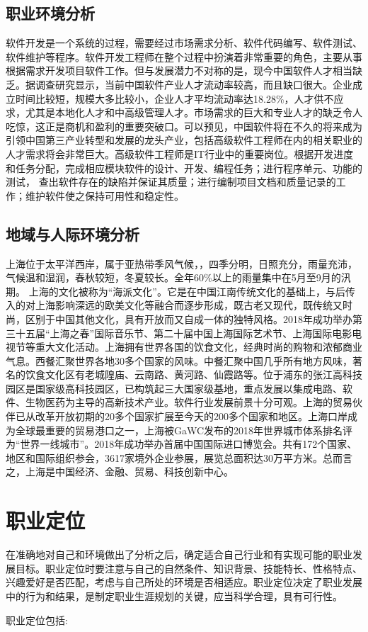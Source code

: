 \documentclass{article}
\begin{document}
\subsection{职业环境分析}
软件开发是一个系统的过程，需要经过市场需求分析、软件代码编写、软件测试、软件维护等程序。软件开发工程师在整个过程中扮演着非常重要的角色，主要从事根据需求开发项目软件工作。但与发展潜力不对称的是，现今中国软件人才相当缺乏。据调查研究显示，当前中国软件产业人才流动率较高，而且缺口很大。企业成立时间比较短，规模大多比较小，企业人才平均流动率达18.28\%，人才供不应求，尤其是本地化人才和中高级管理人才。市场需求的巨大和专业人才的缺乏令人吃惊，这正是商机和盈利的重要突破口。可以预见，中国软件将在不久的将来成为引领中国第三产业转型和发展的龙头产业，包括高级软件工程师在内的相关职业的人才需求将会非常巨大。高级软件工程师是IT行业中的重要岗位。根据开发进度和任务分配，完成相应模块软件的设计、开发、编程任务；进行程序单元、功能的测试， 查出软件存在的缺陷并保证其质量；进行编制项目文档和质量记录的工作；维护软件使之保持可用性和稳定性。\par


\subsection{地域与人际环境分析}
上海位于太平洋西岸，属于亚热带季风气候，，四季分明，日照充分，雨量充沛，气候温和湿润，春秋较短，冬夏较长。全年60\%以上的雨量集中在5月至9月的汛期。 上海的文化被称为“海派文化”。它是在中国江南传统文化的基础上，与后传入的对上海影响深远的欧美文化等融合而逐步形成，既古老又现代，既传统又时尚，区别于中国其他文化，具有开放而又自成一体的独特风格。2018年成功举办第三十五届“上海之春”国际音乐节、第二十届中国上海国际艺术节、上海国际电影电视节等重大文化活动。上海拥有世界各国的饮食文化，经典时尚的购物和浓郁商业气息。西餐汇聚世界各地30多个国家的风味。中餐汇聚中国几乎所有地方风味，著名的饮食文化区有老城隍庙、云南路、黄河路、仙霞路等。位于浦东的张江高科技园区是国家级高科技园区，已构筑起三大国家级基地，重点发展以集成电路、软件、生物医药为主导的高新技术产业。软件行业发展前景十分可观。上海的贸易伙伴已从改革开放初期的20多个国家扩展至今天的200多个国家和地区。上海口岸成为全球最重要的贸易港口之一，上海被GaWC发布的2018年世界城市体系排名评为“世界一线城市”。2018年成功举办首届中国国际进口博览会。共有172个国家、地区和国际组织参会，3617家境外企业参展，展览总面积达30万平方米。总而言之，上海是中国经济、金融、贸易、科技创新中心。\par



\section{职业定位}
在准确地对自己和环境做出了分析之后，确定适合自己行业和有实现可能的职业发展目标。职业定位时要注意与自己的自然条件、知识背景、技能特长、性格特点、兴趣爱好是否匹配，考虑与自己所处的环境是否相适应。职业定位决定了职业发展中的行为和结果，是制定职业生涯规划的关键，应当科学合理，具有可行性。\par
职业定位包括:\par
\end{document}
